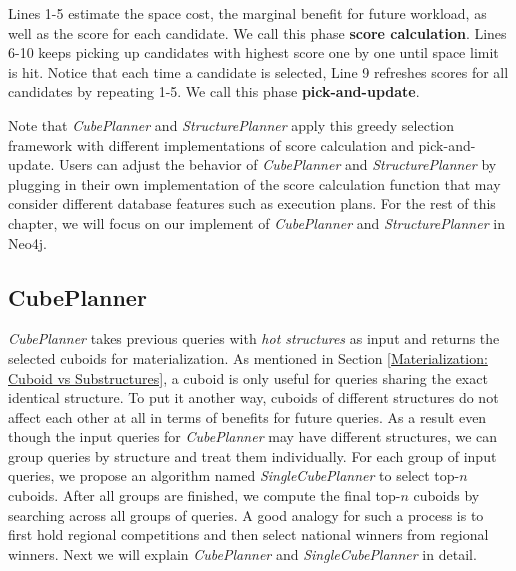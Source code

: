 	Lines 1-5 estimate the space cost, the marginal benefit for future workload, as well as the score for each candidate. We call this phase  \textbf{score calculation}. Lines 6-10 keeps picking up candidates with highest score one by one until space limit is hit. Notice that each time a candidate is selected, Line 9 refreshes scores for all candidates by repeating 1-5. We call this phase \textbf{pick-and-update}.
	
	Note that \emph{CubePlanner} and \emph{StructurePlanner} apply this greedy selection framework with different implementations of score calculation and pick-and-update. Users can adjust the behavior of \emph{CubePlanner} and \emph{StructurePlanner} by plugging in their own implementation of the score calculation function that may consider different database features such as execution plans. For the rest of this chapter, we will focus on our implement of  \emph{CubePlanner} and \emph{StructurePlanner} in Neo4j.
	
	\subsection{CubePlanner}
	\label{sec:CubePlanner}
	
	\emph{CubePlanner} takes previous queries with \emph{hot structures} as input and returns the selected cuboids for materialization. As mentioned in Section \ref{Materialization: Cuboid vs Substructures}, a cuboid is only useful for queries sharing the exact identical structure. To put it another way, cuboids of different structures do not affect each other at all in terms of benefits for future queries. As a result even though the input queries for \emph{CubePlanner} may have different structures, we can group queries by structure and treat them individually. For each group of input queries, we propose an algorithm named \emph{SingleCubePlanner} to select top-$n$ cuboids. After all groups are finished, we compute the final top-$n$ cuboids by searching across all groups of queries. A good analogy for such a process is to first hold regional competitions and then select national winners from regional winners. Next we will explain \emph{CubePlanner} and \emph{SingleCubePlanner} in detail.
	

